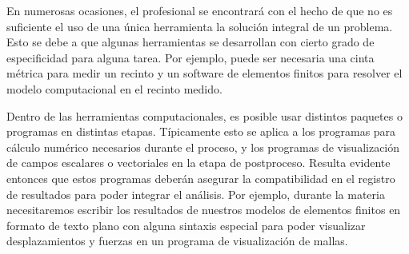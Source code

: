 \newcommand{\userbar}[2]{
\begin{tikzpicture}
  \fill [gray] (0,0) rectangle (1,1.5); 
  \node (#2) [fit={(0,0) (3,1)},text width=\textwidth,align=left] at (1.5,0.5) {\textbf{#1}};
\end{tikzpicture}
}

\newcommand{\pcbar}[4]{
\begin{tikzpicture}
  \fill [Cerulean] (#1,0) rectangle (#2,1.5); 
  \node (#4) [fit={(0,0) (3,1)},text width=\textwidth,align=left] at (1.5,0.5) {\textbf{#3}};
\end{tikzpicture}
}


En numerosas ocasiones, el profesional se encontrará con el 
hecho de que no es suficiente el uso de una única herramienta 
la solución integral de un problema. Esto se debe a que 
algunas herramientas se desarrollan con cierto grado de 
especificidad para alguna tarea. Por ejemplo, puede 
ser necesaria una cinta métrica para medir un recinto 
y un software de elementos finitos para resolver 
el modelo computacional en el recinto medido. 

Dentro de las herramientas computacionales, es posible
usar distintos paquetes o programas en distintas etapas.
Típicamente esto se aplica a los programas para cálculo
numérico necesarios durante el proceso, y los programas
de visualización de campos escalares o vectoriales en
la etapa de postproceso. Resulta evidente entonces
que estos programas deberán asegurar la compatibilidad
en el registro de resultados para poder integrar 
el análisis. Por ejemplo, durante la materia necesitaremos
escribir los resultados de nuestros modelos de elementos
finitos en formato de texto plano con alguna sintaxis
especial para poder visualizar desplazamientos y 
fuerzas en un programa de visualización de 
mallas. 

\mode*

